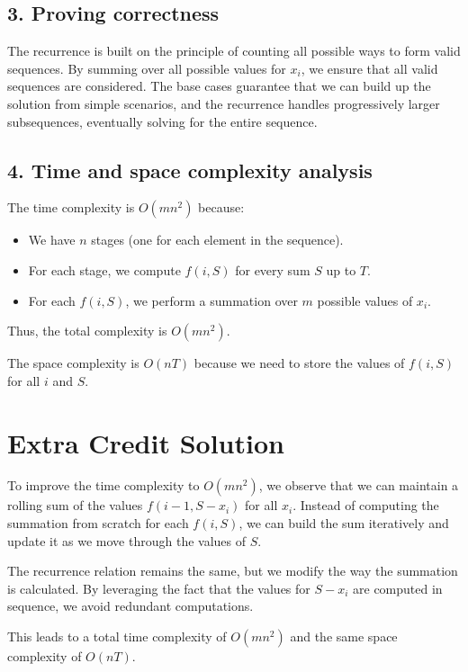 \documentclass[11pt]{article}
\begin{document}
\subsection*{3. Proving correctness}
The recurrence is built on the principle of counting all possible ways to form valid sequences. By summing over all possible values for \( x_i \), we ensure that all valid sequences are considered. The base cases guarantee that we can build up the solution from simple scenarios, and the recurrence handles progressively larger subsequences, eventually solving for the entire sequence.

\subsection*{4. Time and space complexity analysis}
The time complexity is \( O(m n^2) \) because:
\begin{itemize}
    \item We have \( n \) stages (one for each element in the sequence).
    \item For each stage, we compute \( f(i, S) \) for every sum \( S \) up to \( T \).
    \item For each \( f(i, S) \), we perform a summation over \( m \) possible values of \( x_i \).
\end{itemize}
Thus, the total complexity is \( O(m n^2) \).

The space complexity is \( O(n T) \) because we need to store the values of \( f(i, S) \) for all \( i \) and \( S \).

\section*{Extra Credit Solution}
To improve the time complexity to \( O(mn^2) \), we observe that we can maintain a rolling sum of the values \( f(i-1, S - x_i) \) for all \( x_i \). Instead of computing the summation from scratch for each \( f(i, S) \), we can build the sum iteratively and update it as we move through the values of \( S \).

The recurrence relation remains the same, but we modify the way the summation is calculated. By leveraging the fact that the values for \( S - x_i \) are computed in sequence, we avoid redundant computations.

This leads to a total time complexity of \( O(mn^2) \) and the same space complexity of \( O(nT) \).


\newpage
\end{document}
